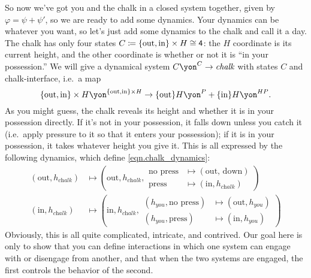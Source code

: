 \documentclass[Book-Poly]{subfiles}
\begin{document}
\begin{example}
So now we've got you and the chalk in a closed system together, given by $\varphi=\psi+\psi'$, so we are ready to add some dynamics. Your dynamics can be whatever you want, so let's just add some dynamics to the chalk and call it a day. The chalk has only four states $C\coloneqq \{\text{out}, \text{in}\} \times H \cong\textsf{4}$: the $H$ coordinate is its current height, and the other coordinate is whether or not it is ``in your possession.'' We will give a dynamical system $C\yon^C\to\textit{chalk}$ with states $C$ and chalk-interface, i.e.\ a map
\begin{equation}\label{eqn.chalk_dynamics}
	\{\text{out}, \text{in}\} \times H\yon^{\{\text{out}, \text{in}\} \times H}\to \{\text{out}\}H\yon^P + \{\text{in}\}H\yon^{HP}.
\end{equation}
As you might guess, the chalk reveals its height and whether it is in your possession directly. If it's not in your possession, it falls down unless you catch it (i.e.\ apply pressure to it so that it enters your possession); if it is in your possession, it takes whatever height you give it. This is all expressed by the following dynamics, which define \eqref{eqn.chalk_dynamics}:
\begin{align*}
  (\text{out}, h_\textit{chalk})&\mapsto
  	\left(\text{out}, h_\textit{chalk},
		\begin{aligned}
			\text{no press} &\mapsto (\text{out, down}) \\
			\text{press} &\mapsto (\text{in}, h_\textit{chalk})
		\end{aligned}\right)\\
	(\text{in}, h_\textit{chalk})&\mapsto
		\left(\text{in},h_\textit{chalk},
		\begin{aligned}
			(h_\textit{you}, \text{no press}) &\mapsto (\text{out}, h_\textit{you}) \\
			(h_\textit{you}, \text{press}) &\mapsto (\text{in}, h_\textit{you})
		\end{aligned}\right)
\end{align*}
Obviously, this is all quite complicated, intricate, and contrived. Our goal here is only to show that you can define interactions in which one system can engage with or disengage from another, and that when the two systems are engaged, the first controls the behavior of the second.
\end{example}
\end{document}
